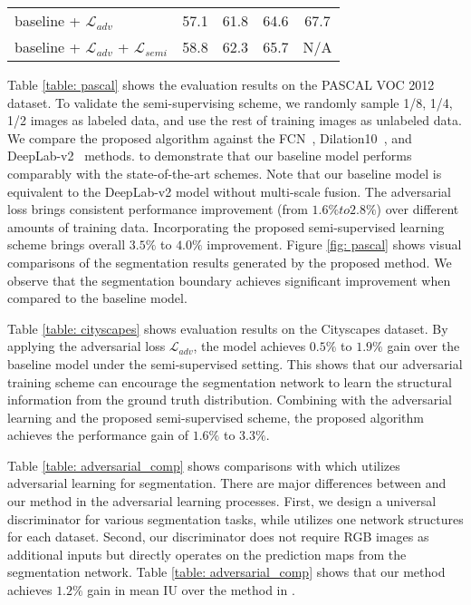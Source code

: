 \documentclass{bmvc2k}
\begin{document}
\begin{table}
\begin{minipage}[t]{.49\linewidth}
\begin{tabular}{lcccc}
				baseline + $\mathcal{L}_{adv}$ & 57.1 & 61.8 & 64.6 & 67.7 \\
				baseline + $\mathcal{L}_{adv}$ + $\mathcal{L}_{semi}$ & 58.8 & 62.3 & 65.7 & N/A \\
				
				\bottomrule
			\end{tabular}
		\end{minipage}
		\vspace{-5mm}
	\end{table}
	
	\vspace{-2mm}{\flushleft \bf PASCAL VOC 2012.}
	Table \ref{table: pascal} shows the evaluation results on the PASCAL VOC 2012 dataset.
	To validate the semi-supervising scheme, we randomly sample 1/8, 1/4, 1/2 images as labeled data, and use the rest of training images as unlabeled data.
	We compare the proposed algorithm against the FCN~\cite{fcn}, Dilation10~\cite{dilated}, and DeepLab-v2~\cite{deeplab} methods.
	to demonstrate that our baseline model performs comparably with the state-of-the-art schemes.
	Note that our baseline model is equivalent to the DeepLab-v2 model without multi-scale fusion.
	The adversarial loss brings consistent performance improvement (from $1.6\%to 2.8\%$) over different amounts of training data.
	Incorporating the proposed semi-supervised learning scheme brings overall $3.5\%$ to $4.0\%$ improvement.
	Figure \ref{fig: pascal} shows visual comparisons of the segmentation results generated by the proposed method. 
	We observe that the segmentation boundary achieves significant improvement when compared to the baseline model.
	
	\vspace{-2mm}{\flushleft \bf Cityscapes.}
	Table \ref{table: cityscapes} shows evaluation results on the Cityscapes dataset.
	By applying the adversarial loss $\mathcal{L}_{adv}$, the model achieves $0.5\%$ to $1.9\%$ gain over the baseline model under the semi-supervised setting.
	This shows that our adversarial training scheme can encourage the segmentation network to learn the structural information from the ground truth distribution.
	Combining with  the adversarial learning and the proposed semi-supervised scheme, 
	the proposed algorithm achieves the performance gain of $1.6\%$ to $3.3\%$. 
	
	\vspace{-2mm}{\flushleft \bf Comparisons with state-of-the-art methods.}
	Table \ref{table: adversarial_comp} shows comparisons with \cite{luc2016semantic} which utilizes adversarial learning for segmentation. 
	There are major differences between \cite{luc2016semantic} and our method
	in the adversarial learning processes. 
	First, we design a universal discriminator for various segmentation tasks, while \cite{luc2016semantic} utilizes one network structures for each dataset.
	Second, our discriminator does not require RGB images as additional inputs 
	but directly operates on the prediction maps from the segmentation network.
	Table \ref{table: adversarial_comp} shows that our method achieves $1.2\%$ gain in mean IU over the method in \cite{luc2016semantic}.
	
\end{document}
